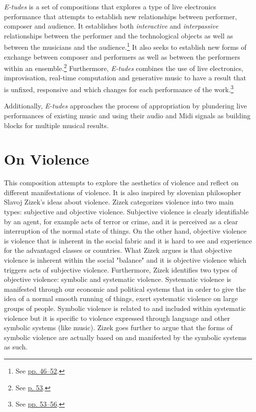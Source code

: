 \emph{E-tudes} is a set of compositions that explores a type of live electronics performance that attempts to establish new relationships between performer, composer and audience. It establishes both \emph{interactive} and \emph{interpassive} relationships between the performer and the technological objects as well as between the musicians and the audience.\footnote{See \hyperlink{relaudience}{pp. 46--52}.} It also seeks to establish new forms of exchange between composer and performers as well as between the performers within an ensemble.\footnote{See \hyperlink{ensembledy}{p. 53}.} Furthermore, \emph{E-tudes} combines the use of live electronics, improvisation, real-time computation and generative music to have a result that is unfixed, responsive and which changes for each performance of the work.\footnote{See \hyperlink{techcomp}{pp. 53--56}.} 

Additionally, \emph{E-tudes} approaches the process of appropriation by plundering live performances of existing music and using their audio and Midi signals as building blocks for multiple musical results. 



\section{On Violence}

This composition attempts to explore the aesthetics of violence and reflect on different manifestations of violence. It is also inspired by slovenian philosopher Slavoj Zizek's ideas about violence. Zizek  categorizes violence into two main types: subjective and objective violence. Subjective violence is clearly identifiable by an agent, for example acts of terror or crime, and it is perceived as a clear interruption of the normal state of things. On the other hand, objective violence is  violence that is inherent in the social fabric and it is hard to see and experience for the advantaged classes or countries. What Zizek argues is that objective violence is inherent within the social "balance" and it is objective violence which triggers acts of subjective violence. Furthermore, Zizek identifies two types of objective violence: symbolic and systematic violence. Systematic violence is manifested through our economic and political systems that in order to give the idea of a normal smooth running of things, exert systematic violence on large groups of people. Symbolic violence is related to and included within systematic violence but it is specific to violence expressed through language and other symbolic systems (like music). Zizek goes further to argue that the forms of symbolic violence are actually based on and manifested by the symbolic systems as such. 

